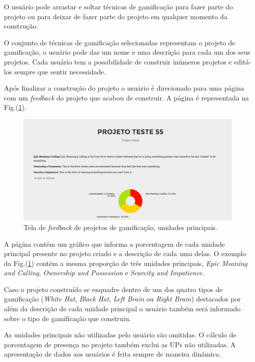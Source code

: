 O usuário pode arrastar e soltar técnicas de gamificação para fazer parte do projeto ou para deixar de fazer parte do projeto em qualquer momento da construção. 

O conjunto de técnicas de gamificação selecionadas representam o projeto de gamificação, o usuário pode dar um nome e uma descrição para cada um dos seus projetos. Cada usuário tem a possibilidade de construir inúmeros projetos e editá-los sempre que sentir necessidade.\newpage

Após finalizar a construção do projeto o usuário é direcionado para uma página com um \textit{feedback} do projeto que acabou de construir. A página é representada na Fig.(\ref{fig11}). 

\begin{figure}[h]
	\centering
		\includegraphics[keepaspectratio=true,scale=0.4]{figuras/detail.png}
	\caption{Tela de \textit{feedback} de projetos de gamificação, unidades principais.\label{fig11}}
\end{figure}


A página contém um gráfico que informa a porcentagem de cada unidade principal presente no projeto criado e a descrição de cada uma delas. O exemplo da Fig.(\ref{fig11}) contém a mesma proporção de três unidades principais, \textit{Epic Meaning and Calling}, \textit{Ownership and Possession} e \textit{Scarcity and Impatience}. 

Caso o projeto construído se enquadre dentro de um dos quatro tipos de gamificação (\textit{White Hat}, \textit{Black Hat}, \textit{Left Brain} ou \textit{Right Brain}) destacados por \cite{chou2015actionable}  além da descrição de cada unidade principal o usuário também será informado sobre o tipo de gamificação que construiu.


As unidades principais não utilizadas pelo usuário são omitidas. O cálculo de porcentagem de presença no projeto também exclui as UPs não utilizadas. A apresentação de dados aos usuários é feita sempre de maneira dinâmica. 

